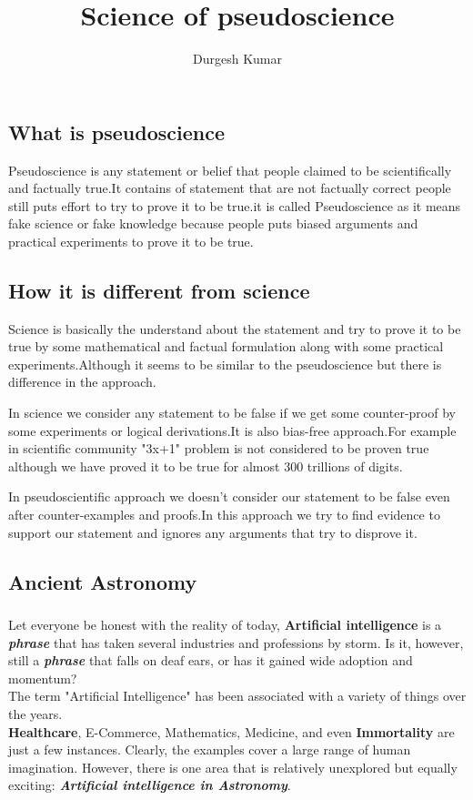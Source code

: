\documentclass[12pt]{article}
\title{Science of pseudoscience}
\author{Durgesh Kumar}
\begin{document}
\maketitle
\subsection*{What is pseudoscience}
Pseudoscience is any statement or belief that people claimed to be scientifically and factually true.It contains of statement that are not factually correct people still puts effort to try to prove it to be true.it is called Pseudoscience as it means fake science or fake knowledge because people puts biased arguments and practical experiments to prove it to be true.
\subsection*{How it is different from science}
Science is basically the understand about the statement and try to prove it to be true by some mathematical and factual formulation along with some practical experiments.Although it seems to be similar to the pseudoscience but there is difference in the approach.
\par
In science we consider any statement to be false if we get some counter-proof by some experiments or logical derivations.It is also bias-free approach.For example in scientific community "3x+1" problem is not considered to be proven true although we have proved it to be true for almost 300 trillions of digits.
\par
In pseudoscientific approach we doesn't consider our statement to be false even after counter-examples and proofs.In this approach we try to find evidence to support our statement and ignores any arguments that try to disprove it.
\subsection*{Ancient Astronomy}
\subsubsection*{}
Let everyone be honest with the reality of today, \textbf{Artificial intelligence} is a \textbf{\textit{phrase}} that has taken several industries and professions by storm. Is it, however, still a \textbf{\textit{phrase}} that falls on deaf ears, or has it gained wide adoption and momentum?
\\
The term "Artificial Intelligence" has been associated with a variety of things over the years.
\\
\textbf{Healthcare}, E-Commerce, Mathematics, Medicine, and even \textbf{Immortality} are just a few instances. Clearly, the examples cover a large range of human imagination. However, there is one area that is relatively unexplored but equally exciting: \textbf{\textit{Artificial intelligence in Astronomy}}.
\\
\end{document}
